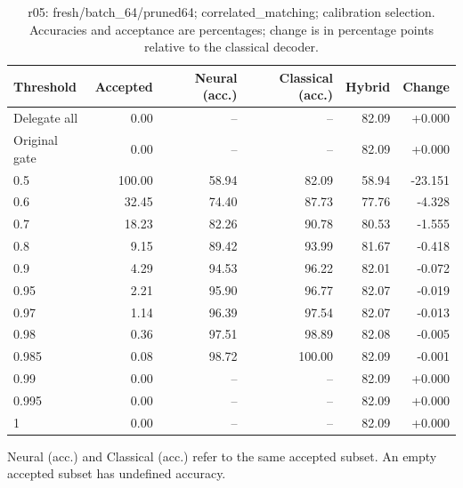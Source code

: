 \begin{table}[htbp]
\centering\small
\setlength{\tabcolsep}{3pt}
\caption{r05: fresh/batch\_64/pruned64; correlated\_matching; calibration selection. Accuracies and acceptance are percentages; change is in percentage points relative to the classical decoder.}
\begin{tabular}{lrrrrr}
\toprule
Threshold & Accepted & Neural (acc.) & Classical (acc.) & Hybrid & Change \\
\midrule
Delegate all & 0.00 & -- & -- & 82.09 & +0.000 \\
Original gate & 0.00 & -- & -- & 82.09 & +0.000 \\
0.5 & 100.00 & 58.94 & 82.09 & 58.94 & -23.151 \\
0.6 & 32.45 & 74.40 & 87.73 & 77.76 & -4.328 \\
0.7 & 18.23 & 82.26 & 90.78 & 80.53 & -1.555 \\
0.8 & 9.15 & 89.42 & 93.99 & 81.67 & -0.418 \\
0.9 & 4.29 & 94.53 & 96.22 & 82.01 & -0.072 \\
0.95 & 2.21 & 95.90 & 96.77 & 82.07 & -0.019 \\
0.97 & 1.14 & 96.39 & 97.54 & 82.07 & -0.013 \\
0.98 & 0.36 & 97.51 & 98.89 & 82.08 & -0.005 \\
0.985 & 0.08 & 98.72 & 100.00 & 82.09 & -0.001 \\
0.99 & 0.00 & -- & -- & 82.09 & +0.000 \\
0.995 & 0.00 & -- & -- & 82.09 & +0.000 \\
1 & 0.00 & -- & -- & 82.09 & +0.000 \\
\bottomrule
\end{tabular}
\par\smallskip\footnotesize Neural (acc.) and Classical (acc.) refer to the same accepted subset. An empty accepted subset has undefined accuracy.
\end{table}
